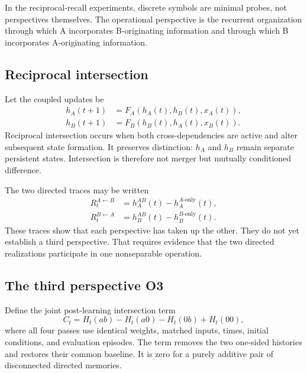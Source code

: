 \documentclass[11pt,a4paper]{article}
\begin{document}
In the reciprocal-recall experiments, discrete symbols are minimal probes, not perspectives themselves. The operational perspective is the recurrent organization through which A incorporates B-originating information and through which B incorporates A-originating information.

\subsection{Reciprocal intersection}

Let the coupled updates be
\begin{align}
 h_A(t+1)&=F_A(h_A(t),h_B(t),x_A(t)),\\
 h_B(t+1)&=F_B(h_B(t),h_A(t),x_B(t)).
 \label{eq:coupled}
\end{align}
Reciprocal intersection occurs when both cross-dependencies are active and alter subsequent state formation. It preserves distinction: $h_A$ and $h_B$ remain separate persistent states. Intersection is therefore not merger but mutually conditioned difference.

The two directed traces may be written
\begin{align}
 R_t^{A\leftarrow B}&=h_A^{AB}(t)-h_A^{A\text{-only}}(t),\\
 R_t^{B\leftarrow A}&=h_B^{AB}(t)-h_B^{B\text{-only}}(t).
 \label{eq:directed}
\end{align}
These traces show that each perspective has taken up the other. They do not yet establish a third perspective. That requires evidence that the two directed realizations participate in one nonseparable operation.

\subsection{The third perspective O3}

Define the joint post-learning intersection term
\begin{equation}
 C_t=H_t(ab)-H_t(a0)-H_t(0b)+H_t(00),
 \label{eq:joint}
\end{equation}
where all four passes use identical weights, matched inputs, times, initial conditions, and evaluation episodes. The term removes the two one-sided histories and restores their common baseline. It is zero for a purely additive pair of disconnected directed memories.
\end{document}
